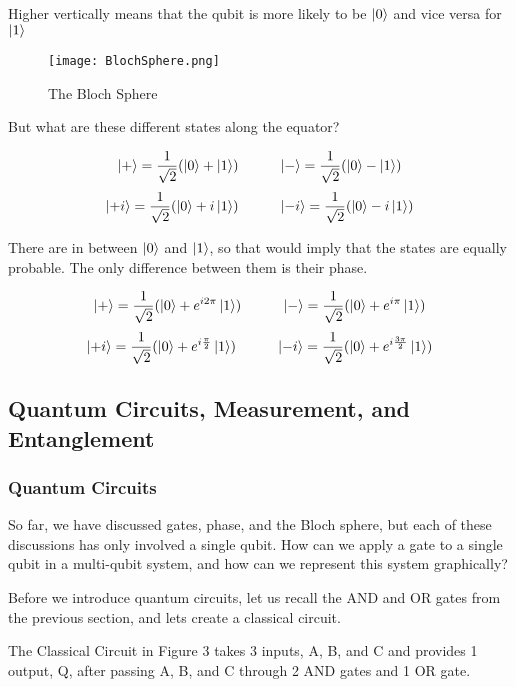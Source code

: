 \documentclass[12pt]{article}
\begin{document}
Higher vertically means that the qubit is more likely to be $\ket{0}$ and vice versa for $\ket{1}$

\begin{figure}[h]
    \centering
    \texttt{[image: BlochSphere.png]}
    \caption{The Bloch Sphere}
    \cite{Bloch_Sphere}
    \label{fig:Bloch_Sphere}
\end{figure}


But what are these different states along the equator? 

$$
\ket{+} = \frac{1}{\sqrt{2}}( \ket{0}  + \ket{1})
\hspace{1cm}
\ket{-} = \frac{1}{\sqrt{2}}( \ket{0}  - \ket{1})
$$
$$
\ket{+i} = \frac{1}{\sqrt{2}}( \ket{0}  + i\ket{1})
\hspace{1cm}
\ket{-i} = \frac{1}{\sqrt{2}}( \ket{0}  - i\ket{1})
$$

There are in between $\ket{0}$ and $\ket{1}$, so that would imply that the states are equally probable. The only difference between them is their phase. 

$$
\ket{+} = \frac{1}{\sqrt{2}}( \ket{0}  + e^{i 2\pi}\ket{1})
\hspace{1cm}
\ket{-} = \frac{1}{\sqrt{2}}( \ket{0}  + e^{i \pi}\ket{1})
$$
$$
\ket{+i} = \frac{1}{\sqrt{2}}( \ket{0}  + e^{i \frac{\pi}{2}}\ket{1})
\hspace{1cm}
\ket{-i} = \frac{1}{\sqrt{2}}( \ket{0}  + e^{i \frac{3\pi}{2}} \ket{1})
$$

\subsection{Quantum Circuits, Measurement, and Entanglement}

\subsubsection{Quantum Circuits}
So far, we have discussed gates, phase, and the Bloch sphere, but each of these discussions has only involved a single qubit. How can we apply a gate to a single qubit in a multi-qubit system, and how can we represent this system graphically? 

Before we introduce quantum circuits, let us recall the AND and OR gates from the previous section, and lets create a classical circuit.

The Classical Circuit in Figure 3 takes 3 inputs, A, B, and C and provides 1 output, Q, after passing A, B, and C through 2 AND gates and 1 OR gate. 
\end{document}
